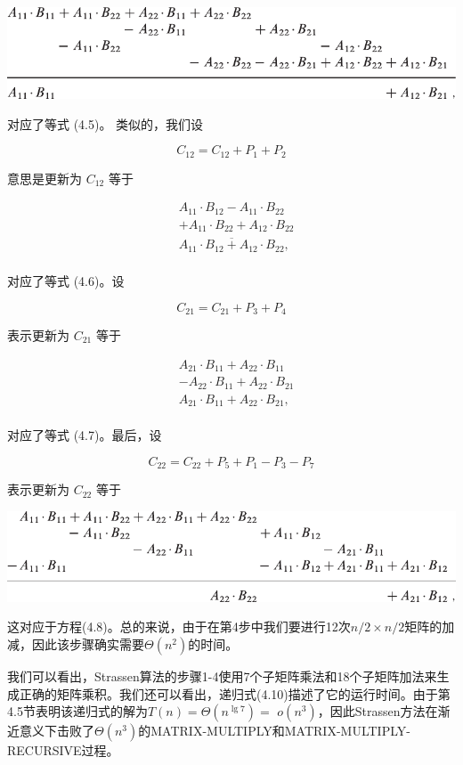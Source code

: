 \documentclass[lang=cn,newtx,10pt,scheme=chinese]{elegantbook}
\begin{document}
\includegraphics{算法导论第四版插图/第四章/斯特拉森算法公式.pdf}

对应了等式 (4.5)。 类似的，我们设

$$
C_{12}=C_{12}+P_1+P_2
$$

意思是更新为 $C_{12}$ 等于

$$
\begin{aligned}
& A_{11} \cdot B_{12}-A_{11} \cdot B_{22} \\
& +A_{11} \cdot B_{22}+A_{12} \cdot B_{22} \\
& \overline{A_{11} \cdot B_{12}+A_{12} \cdot B_{22}} \text {, } \\
&
\end{aligned}
$$

对应了等式 (4.6)。设

$$
C_{21}=C_{21}+P_3+P_4
$$

表示更新为 $C_{21}$ 等于

$$
\begin{aligned}
& A_{21} \cdot B_{11}+A_{22} \cdot B_{11} \\
& -A_{22} \cdot B_{11}+A_{22} \cdot B_{21} \\
& A_{21} \cdot B_{11}+A_{22} \cdot B_{21} \text {, } \\
&
\end{aligned}
$$

对应了等式 (4.7)。最后，设

$$
C_{22}=C_{22}+P_5+P_1-P_3-P_7
$$

表示更新为 $C_{22}$ 等于

\includegraphics{算法导论第四版插图/第四章/斯特拉森公式2.pdf}

这对应于方程(4.8)。总的来说，由于在第4步中我们要进行12次$n/2\times n/2$矩阵的加减，因此该步骤确实需要$\Theta\left(n^2\right)$的时间。

我们可以看出，Strassen算法的步骤1-4使用7个子矩阵乘法和18个子矩阵加法来生成正确的矩阵乘积。我们还可以看出，递归式(4.10)描述了它的运行时间。由于第4.5节表明该递归式的解为$T(n)=\Theta\left(n^{\lg 7}\right)=$ $o\left(n^3\right)$，因此Strassen方法在渐近意义下击败了$\Theta\left(n^3\right)$的MATRIX-MULTIPLY和MATRIX-MULTIPLY-RECURSIVE过程。
\end{document}
